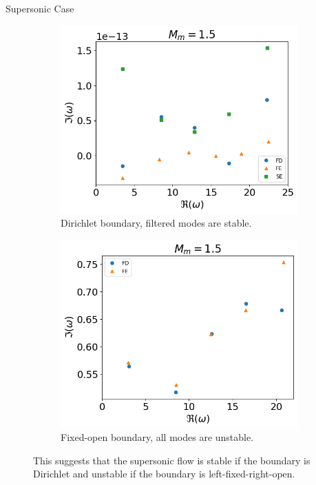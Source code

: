 \begin{frame}{Supersonic Case}
  \begin{figure} [H]
    \centering
    \begin{subfigure}{0.45\textwidth}
      \centering
      \includegraphics[width=\linewidth]{../../thesis/img/numerical-experiments/fixed-fixed/supersonic-v}
      \caption{Dirichlet boundary, filtered modes are stable.}
    \end{subfigure}%
    \begin{subfigure}{0.45\textwidth}
      \centering
      \includegraphics[width=\linewidth]{../../thesis/img/numerical-experiments/fixed-open/supersonic-v}
      \caption{Fixed-open boundary, all modes are unstable.}
    \end{subfigure}
    \caption{This suggests that the supersonic flow is stable if the boundary is Dirichlet and unstable if the boundary is left-fixed-right-open.}
  \end{figure}
\end{frame}

